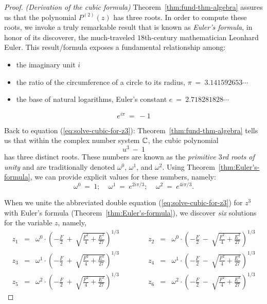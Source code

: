 \begin{proof} {\it (Derivation of the cubic formula)}
Theorem~\ref{thm:fund-thm-algebra} assures us that the polynomial
$P^{(2)}(z)$ has three roots.  In order to compute these roots, we
invoke a truly remarkable result that is known as  {\it Euler's formula}, in honor of its discoverer, the
much-traveled $18$th-century mathematician Leonhard
Euler.  This result/formula exposes a
fundamental relationship among:
\begin{itemize}
\item
the imaginary unit  $i$
\item
the ratio of the circumference of a circle to its radius,
$\pi \ = \ 3.141592653 \cdots$
\item
the base of natural logarithms, Euler's constant $e \ = \ 2.718281828 \cdots$
\end{itemize}

\begin{theorem}
\label{thm:Euler's-formula}
\[ e^{i \pi} \ = \ -1 \]
\end{theorem}

Back to equation (\ref{eq:solve-cubic-for-z3}):
Theorem~\ref{thm:fund-thm-algebra} tells us that within the complex
number system $\mathbb{C}$, the cubic polynomial
\[ u^3 \ - \ 1 \]
has three distinct roots.  These numbers are known as the {\em
  primitive $3$rd roots of unity}  and are traditionally denoted $\omega^0$, $\omega^1$, and
$\omega^2$.  Using Theorem~\ref{thm:Euler's-formula}, we can provide
explicit values for these numbers, namely:
\[ \omega^0 \ = \ 1; \ \ \ \ \
\omega^1 \ = \ e^{2i \pi/3}; \ \ \ \ \
\omega^2 \ = \ e^{4i \pi/3}.
\]

\medskip
When we unite the abbreviated double equation
(\ref{eq:solve-cubic-for-z3}) for $z^3$ with Euler's formula
(Theorem~\ref{thm:Euler's-formula}), we discover {\em six} solutions
for the variable $z$, namely, {\small
\begin{equation}
\label{eq:cubic-solution-1}
\begin{array}{ccrrrrrccr}
z_1 & = &
{\displaystyle
\omega^0 \cdot
\left( -\frac{F}{2} \ + \ \sqrt{\frac{F^2}{4} + \frac{E^3}{27}}
\right)^{1/3} 
}
  & & & & &
z_2 & = &
{\displaystyle
\omega^0 \cdot
\left( -\frac{F}{2} \ - \ \sqrt{\frac{F^2}{4} + \frac{E^3}{27}}
\right)^{1/3}
} \\
z_3 & = &
{\displaystyle
\omega^1 \cdot
\left( -\frac{F}{2} \ + \ \sqrt{\frac{F^2}{4} + \frac{E^3}{27}}
\right)^{1/3}
}
  & & & & & 
z_4 & = &
{\displaystyle
\omega^1 \cdot
\left( -\frac{F}{2} \ - \ \sqrt{\frac{F^2}{4} + \frac{E^3}{27}}
\right)^{1/3}
} \\
z_5 & = &
{\displaystyle
\omega^2 \cdot
\left( -\frac{F}{2} \ + \ \sqrt{\frac{F^2}{4} + \frac{E^3}{27}}
\right)^{1/3}
}
  & & & & &
z_6 & = &
{\displaystyle
\omega^2 \cdot
\left( -\frac{F}{2} \ - \ \sqrt{\frac{F^2}{4} + \frac{E^3}{27}}
\right)^{1/3}
}
\end{array}
\end{equation}
}


\end{proof}
